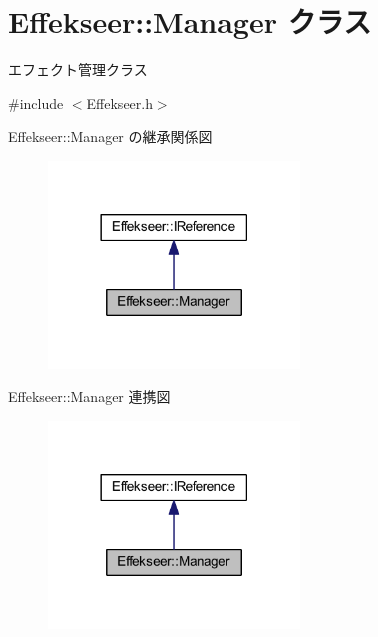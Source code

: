 \hypertarget{class_effekseer_1_1_manager}{}\section{Effekseer\+:\+:Manager クラス}
\label{class_effekseer_1_1_manager}


エフェクト管理クラス  




{\ttfamily \#include $<$Effekseer.\+h$>$}



Effekseer\+:\+:Manager の継承関係図\nopagebreak
\begin{figure}[H]
\begin{center}
\leavevmode
\includegraphics[width=189pt]{class_effekseer_1_1_manager__inherit__graph}
\end{center}
\end{figure}


Effekseer\+:\+:Manager 連携図\nopagebreak
\begin{figure}[H]
\begin{center}
\leavevmode
\includegraphics[width=189pt]{class_effekseer_1_1_manager__coll__graph}
\end{center}
\end{figure}
